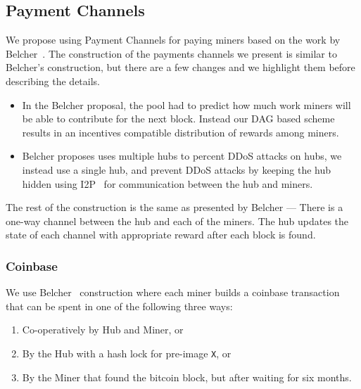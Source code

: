 \documentclass{article}
\begin{document}
\subsection{Payment Channels}\label{ref:channels}

We propose using Payment Channels for paying miners based on the work
by Belcher~\cite{channels-for-rewards}. The construction of the
payments channels we present is similar to Belcher's construction, but
there are a few changes and we highlight them before describing the
details.

\begin{itemize}
\item In the Belcher proposal, the pool had to predict how much work
  miners will be able to contribute for the next block. Instead our
  DAG based scheme results in an incentives compatible distribution of
  rewards among miners.
\item Belcher proposes uses multiple hubs to percent DDoS attacks on
  hubs, we instead use a single hub, and prevent DDoS attacks by keeping the
  hub hidden using I2P~\cite{i2p, i2p-censorship-resistance} for
  communication between the hub and miners.
\end{itemize}

The rest of the construction is the same as presented by Belcher ---
There is a one-way channel between the hub and each of the miners. The
hub updates the state of each channel with appropriate reward after
each block is found.



\subsubsection{Coinbase}

We use Belcher~\cite{channels-for-rewards} construction where each
miner builds a coinbase transaction that can be spent in one of the
following three ways:

\begin{enumerate}
\item Co-operatively by Hub and Miner, or
\item By the Hub with a hash lock for pre-image \verb|X|, or
\item By the Miner that found the bitcoin block, but after waiting for
  six months.
\end{enumerate}
\end{document}
